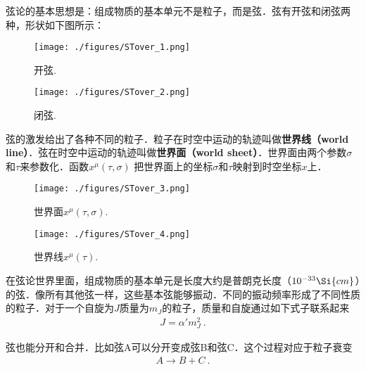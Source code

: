 弦论的基本思想是：组成物质的基本单元不是粒子，而是弦．弦有开弦和闭弦两种，形状如下图所示：
\begin{figure}[ht]
\centering
\texttt{[image: ./figures/STover\_1.png]}
\caption{开弦.} \label{STover_fig1}
\end{figure}
\begin{figure}[ht]
\centering
\texttt{[image: ./figures/STover\_2.png]}
\caption{闭弦.} \label{STover_fig2}
\end{figure}
弦的激发给出了各种不同的粒子．粒子在时空中运动的轨迹叫做\textbf{世界线（world line）}．弦在时空中运动的轨迹叫做\textbf{世界面（world sheet）}．世界面由两个参数$\sigma$和$\tau$来参数化．函数$x^\mu(\tau,\sigma)$ 把世界面上的坐标$\sigma$和$\tau$映射到时空坐标$x$上．

\begin{figure}[ht]
\centering
\texttt{[image: ./figures/STover\_3.png]}
\caption{世界面$x^\mu (\tau,\sigma)$.} \label{STover_fig3}
\end{figure}

\begin{figure}[ht]
\centering
\texttt{[image: ./figures/STover\_4.png]}
\caption{世界线$x^\mu(\tau)$.} \label{STover_fig4}
\end{figure}

在弦论世界里面，组成物质的基本单元是长度大约是普朗克长度（$10^{-33}\Si{cm}$）的弦．像所有其他弦一样，这些基本弦能够振动．不同的振动频率形成了不同性质的粒子．对于一个自旋为$J$质量为$m_J$的粒子，质量和自旋通过如下式子联系起来
\begin{align}
J = \alpha' m_J^2~.
\end{align}

弦也能分开和合并．比如弦A可以分开变成弦B和弦C．这个过程对应于粒子衰变
\begin{align}
A \rightarrow B + C~.
\end{align}


